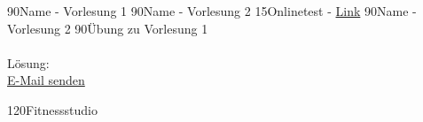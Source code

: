 \documentclass{article}
\begin{document}
  \begin{plan}
    \VorlEins {} {90}{Name - Vorlesung 1}
    \VorlZwei {} {90}{Name - Vorlesung 2}
    \Deadline {} {15}{Onlinetest - \href{www.test.de}{Link}}
    \VorlDrei {} {90}{Name - Vorlesung 2}
    \Uebung {} {90}{Übung zu Vorlesung 1\\\ \\Lösung:\\ \href{mailto:max.mustermann@gmail.com}{E-Mail senden}}
    
    \Privat {} {120}{Fitnessstudio}
    \Legende{\LVorlEins\LVorlZwei\LVorlDrei\LUebung\LTutorium\LSeminar\LPrivat}
  \end{plan}
\end{document}
